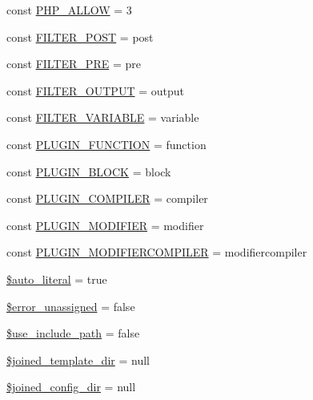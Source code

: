 \begin{DoxyCompactItemize}
\item 
const \hyperlink{class_smarty_a95914b201d2627600faf1a65cb4e7115}{P\+H\+P\+\_\+\+A\+L\+L\+O\+W} = 3
\item 
const \hyperlink{class_smarty_adbf5a5e917688e56a5980bcf6257477a}{F\+I\+L\+T\+E\+R\+\_\+\+P\+O\+S\+T} = \textquotesingle{}post\textquotesingle{}
\item 
const \hyperlink{class_smarty_ad093197eaa7160271f4668c971478ec9}{F\+I\+L\+T\+E\+R\+\_\+\+P\+R\+E} = \textquotesingle{}pre\textquotesingle{}
\item 
const \hyperlink{class_smarty_aed61a81051bbb199555a03a2b45631b4}{F\+I\+L\+T\+E\+R\+\_\+\+O\+U\+T\+P\+U\+T} = \textquotesingle{}output\textquotesingle{}
\item 
const \hyperlink{class_smarty_a07041c936875d9504110cdff7dafc6bc}{F\+I\+L\+T\+E\+R\+\_\+\+V\+A\+R\+I\+A\+B\+L\+E} = \textquotesingle{}variable\textquotesingle{}
\item 
const \hyperlink{class_smarty_a21d2a55919184c21a26c85523c6cadfb}{P\+L\+U\+G\+I\+N\+\_\+\+F\+U\+N\+C\+T\+I\+O\+N} = \textquotesingle{}function\textquotesingle{}
\item 
const \hyperlink{class_smarty_a2e63fca0e26cc83f27a50354418a01b7}{P\+L\+U\+G\+I\+N\+\_\+\+B\+L\+O\+C\+K} = \textquotesingle{}block\textquotesingle{}
\item 
const \hyperlink{class_smarty_a65de331533aad88f59738c56ebd70c05}{P\+L\+U\+G\+I\+N\+\_\+\+C\+O\+M\+P\+I\+L\+E\+R} = \textquotesingle{}compiler\textquotesingle{}
\item 
const \hyperlink{class_smarty_a601f50b353718715e0c9c2ba4ab1b6d5}{P\+L\+U\+G\+I\+N\+\_\+\+M\+O\+D\+I\+F\+I\+E\+R} = \textquotesingle{}modifier\textquotesingle{}
\item 
const \hyperlink{class_smarty_a6d2292b274afbbc56b46bf0064257c21}{P\+L\+U\+G\+I\+N\+\_\+\+M\+O\+D\+I\+F\+I\+E\+R\+C\+O\+M\+P\+I\+L\+E\+R} = \textquotesingle{}modifiercompiler\textquotesingle{}
\item 
\hyperlink{class_smarty_a46ed4da4d4b243a11bb9ba4826d310e4}{\$auto\+\_\+literal} = true
\item 
\hyperlink{class_smarty_aaccca4d5f12266dfc813b9ebe920d4e0}{\$error\+\_\+unassigned} = false
\item 
\hyperlink{class_smarty_a7bdf6717c975c21ab609d6b8f7027c20}{\$use\+\_\+include\+\_\+path} = false
\item 
\hyperlink{class_smarty_a8d8ecb17a0338a52a5a6693618abbfe8}{\$joined\+\_\+template\+\_\+dir} = null
\item 
\hyperlink{class_smarty_a4b1843c13f0cbdeb4355965465666faf}{\$joined\+\_\+config\+\_\+dir} = null

\end{DoxyCompactItemize}
